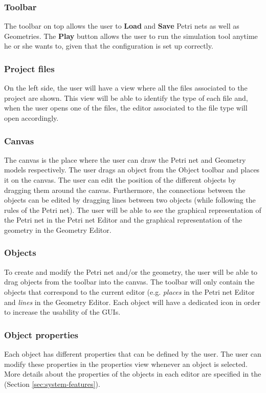\begin{figure}[ht]
\end{figure}

\subsubsection{Toolbar}
The toolbar on top allows the user to \textbf{Load} and \textbf{Save} Petri nets as well as Geometries. The \textbf{Play} button allows the user to run the simulation tool anytime he or she wants to, given that the configuration is set up correctly. 

\subsubsection{Project files}
On the left side, the user will have a view where all the files associated to the project are shown. This view will be able to identify the type of each file and, when the user opens one of the files, the editor associated to the file type will open accordingly. 

\subsubsection{Canvas}
The canvas is the place where the user can draw the Petri net and Geometry models respectively. The user drags an object from the Object toolbar and places it on the canvas. The user can edit the position of the different objects by dragging them around the canvas. Furthermore, the connections between the objects can be edited by dragging lines between two objects (while following the rules of the Petri net). The user will be able to see the graphical representation of the Petri net in the Petri net Editor and the graphical representation of the geometry in the Geometry Editor. 

\subsubsection{Objects}
To create and modify the Petri net and/or the geometry, the user will be able to drag objects from the toolbar into the canvas. The toolbar will only contain the objects that correspond to the current editor (e.g. \textit{places} in the Petri net Editor and \textit{lines} in the Geometry Editor. Each object will have a dedicated icon in order to increase the usability of the GUIs.

\subsubsection{Object properties}
Each object has different properties that can be defined by the user. The user can modify these properties in the properties view whenever an object is selected. More details about the properties of the objects in each editor are specified in the (Section \ref{sec:system-features}).


